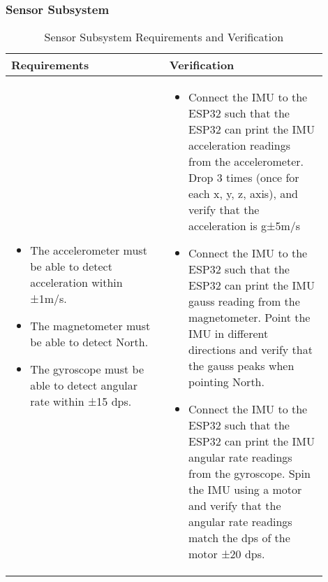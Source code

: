 \subsubsection{Sensor Subsystem}
\begin{table}[h]
    \centering
    \caption{Sensor Subsystem Requirements and Verification}
    \begin{tabular}{p{0.45\linewidth}p{0.45\linewidth}}
    \toprule
    \textbf{Requirements} & \textbf{Verification} \\
    \midrule
    \begin{itemize}[leftmargin=*, nosep, after=\strut]
        \item The accelerometer must be able to detect acceleration within ±1m/s.
        \item The magnetometer must be able to detect North.
        \item The gyroscope must be able to detect angular rate within ±15 dps.
        
        
    \end{itemize} &
    \begin{itemize}[leftmargin=*, nosep, after=\strut]
        \item Connect the IMU to the ESP32 such that the ESP32 can print the IMU acceleration readings from the accelerometer. Drop 3 times (once for each x, y, z, axis), and verify that the acceleration is g±5m/s
        \item Connect the IMU to the ESP32 such that the ESP32 can print the IMU gauss reading from the magnetometer. Point the IMU in different directions and verify that the gauss peaks when pointing North.
        \item Connect the IMU to the ESP32 such that the ESP32 can print the IMU angular rate readings from the gyroscope. Spin the IMU using a motor and verify that the angular rate readings match the dps of the motor ±20 dps.
        
    \end{itemize} \\
    \bottomrule
    \end{tabular}
    \end{table}
    \newpage
